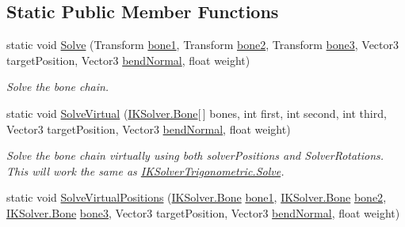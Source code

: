 \subsection*{Static Public Member Functions}
\begin{DoxyCompactItemize}
\item 
static void \mbox{\hyperlink{class_root_motion_1_1_final_i_k_1_1_i_k_solver_trigonometric_ae9c8628f1df3c4524407e94a2d303c5f}{Solve}} (Transform \mbox{\hyperlink{class_root_motion_1_1_final_i_k_1_1_i_k_solver_trigonometric_a3c29124b8fc59d81406c2ce57da202eb}{bone1}}, Transform \mbox{\hyperlink{class_root_motion_1_1_final_i_k_1_1_i_k_solver_trigonometric_a27296f269cce9e3806879ffc67778525}{bone2}}, Transform \mbox{\hyperlink{class_root_motion_1_1_final_i_k_1_1_i_k_solver_trigonometric_ac8cfb2c6ba0009f99bfde09b6b174a3a}{bone3}}, Vector3 target\+Position, Vector3 \mbox{\hyperlink{class_root_motion_1_1_final_i_k_1_1_i_k_solver_trigonometric_ae48bca2ec4e7a16ffaf196ea956be5e9}{bend\+Normal}}, float weight)
\begin{DoxyCompactList}\small\item\em Solve the bone chain. \end{DoxyCompactList}\item 
static void \mbox{\hyperlink{class_root_motion_1_1_final_i_k_1_1_i_k_solver_trigonometric_a6d5eeb863d378ba5150479f5ac779e1a}{Solve\+Virtual}} (\mbox{\hyperlink{class_root_motion_1_1_final_i_k_1_1_i_k_solver_1_1_bone}{I\+K\+Solver.\+Bone}}\mbox{[}$\,$\mbox{]} bones, int first, int second, int third, Vector3 target\+Position, Vector3 \mbox{\hyperlink{class_root_motion_1_1_final_i_k_1_1_i_k_solver_trigonometric_ae48bca2ec4e7a16ffaf196ea956be5e9}{bend\+Normal}}, float weight)
\begin{DoxyCompactList}\small\item\em Solve the bone chain virtually using both solver\+Positions and Solver\+Rotations. This will work the same as \mbox{\hyperlink{class_root_motion_1_1_final_i_k_1_1_i_k_solver_trigonometric_ae9c8628f1df3c4524407e94a2d303c5f}{I\+K\+Solver\+Trigonometric.\+Solve}}. \end{DoxyCompactList}\item 
static void \mbox{\hyperlink{class_root_motion_1_1_final_i_k_1_1_i_k_solver_trigonometric_a628f0c52670d60945c8b8e9fb5978778}{Solve\+Virtual\+Positions}} (\mbox{\hyperlink{class_root_motion_1_1_final_i_k_1_1_i_k_solver_1_1_bone}{I\+K\+Solver.\+Bone}} \mbox{\hyperlink{class_root_motion_1_1_final_i_k_1_1_i_k_solver_trigonometric_a3c29124b8fc59d81406c2ce57da202eb}{bone1}}, \mbox{\hyperlink{class_root_motion_1_1_final_i_k_1_1_i_k_solver_1_1_bone}{I\+K\+Solver.\+Bone}} \mbox{\hyperlink{class_root_motion_1_1_final_i_k_1_1_i_k_solver_trigonometric_a27296f269cce9e3806879ffc67778525}{bone2}}, \mbox{\hyperlink{class_root_motion_1_1_final_i_k_1_1_i_k_solver_1_1_bone}{I\+K\+Solver.\+Bone}} \mbox{\hyperlink{class_root_motion_1_1_final_i_k_1_1_i_k_solver_trigonometric_ac8cfb2c6ba0009f99bfde09b6b174a3a}{bone3}}, Vector3 target\+Position, Vector3 \mbox{\hyperlink{class_root_motion_1_1_final_i_k_1_1_i_k_solver_trigonometric_ae48bca2ec4e7a16ffaf196ea956be5e9}{bend\+Normal}}, float weight)

\end{DoxyCompactItemize}
